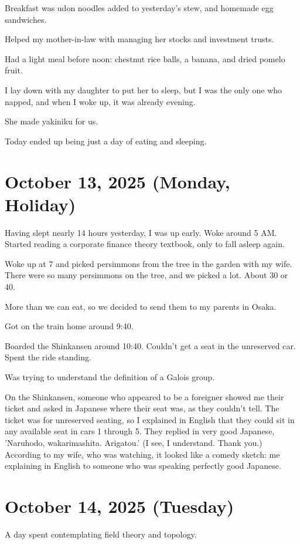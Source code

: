 \documentclass{article}
\begin{document}
Breakfast was udon noodles added to yesterday's stew, and homemade egg sandwiches.

Helped my mother-in-law with managing her stocks and investment trusts.

Had a light meal before noon: chestnut rice balls, a banana, and dried pomelo fruit.

I lay down with my daughter to put her to sleep, but I was the only one who napped, and when I woke up, it was already evening.

She made yakiniku for us.

Today ended up being just a day of eating and sleeping.

\section{October 13, 2025 (Monday, Holiday)}

Having slept nearly 14 hours yesterday, I was up early. Woke around 5 AM.
Started reading a corporate finance theory textbook, only to fall asleep again.

Woke up at 7 and picked persimmons from the tree in the garden with my wife.
There were so many persimmons on the tree, and we picked a lot.
About 30 or 40.

More than we can eat, so we decided to send them to my parents in Osaka.

Got on the train home around 9:40.

Boarded the Shinkansen around 10:40.
Couldn't get a seat in the unreserved car.
Spent the ride standing.

Was trying to understand the definition of a Galois group.

On the Shinkansen, someone who appeared to be a foreigner showed me their ticket and asked in Japanese where their seat was, as they couldn't tell.
The ticket was for unreserved seating, so I explained in English that they could sit in any available seat in cars 1 through 5.
They replied in very good Japanese, 'Naruhodo, wakarimashita. Arigatou.' (I see, I understand. Thank you.)
According to my wife, who was watching, it looked like a comedy sketch: me explaining in English to someone who was speaking perfectly good Japanese.

\section{October 14, 2025 (Tuesday)}

A day spent contemplating field theory and topology.
\end{document}
